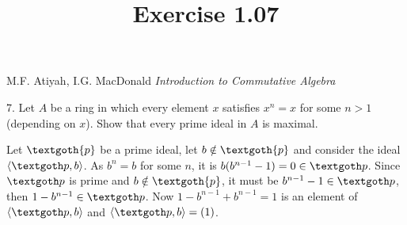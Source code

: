\documentclass{article}
\title{Exercise 1.07}
\begin{document}
\maketitle

\begin{center}
M.F. Atiyah, I.G. MacDonald \emph{Introduction to Commutative Algebra}
\end{center}

\vspace*{10px} 

7. Let $A$ be a ring in which every element $x$ satisfies $ x^n = x $ for some $n > 1$ (depending on $x$). Show that every prime ideal in $A$ is maximal.

\vspace*{10px} 

Let $ \textgoth{p} $ be a prime ideal, let $ b \notin \textgoth{p} $ and consider the ideal $ \langle \textgoth p , b \rangle $. As $ b^n = b $ for some $n$, it is $ b(b^{n-1} - 1) = 0 \in \textgoth p$. Since $\textgoth p$ is prime and $ b \notin \textgoth{p} $, it must be $ b^{n-1} - 1 \in \textgoth p $, then $ 1 - b^{n-1} \in \textgoth p $. Now $ 1 - b^{n-1} + b^{n-1}= 1 $ is an element of $ \langle \textgoth p , b \rangle $ and $ \langle \textgoth p , b \rangle = (1) $.
\end{document}
